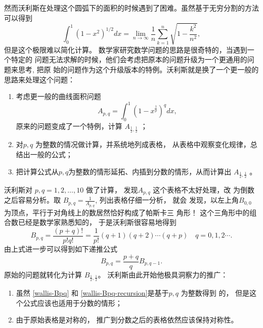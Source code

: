 {然而沃利斯在处理这个圆弧下的面积的时候遇到了困难。虽然基于无穷分割的方法可以得到 
$$ \int_0^1 (1-x^2)^{1/2} dx = \lim_{n\rightarrow \infty} \frac{1}{n} \sum^n_{k=1} \sqrt{1-\frac{k^2}{n^2}} ,$$ 
但是这个极限难以简化计算。 数学家研究数学问题的思路是很奇特的，当遇到一个特定的
问题无法求解的时候，他们会考虑把原本的问题升级为一个更通用的问题来思考, 把原
始的问题作为这个升级版本的特例。沃利斯就是换了一个更一般的思路来处理这个问题：

\begin{enumerate}
\item 考虑更一般的曲线面积问题
$$ A_{p,q} = \int_0^1 (1-x^\frac{1}{p})^q dx ,$$ 
原来的问题变成了一个特例，计算 $A_{\frac{1}{2},\frac{1}{2}}$ ；

\item 对$p,q$ 为整数的情况做计算，并系统地列成表格， 从表格中观察变化规律，总结出一般的公式；
\item 把计算公式从$p,q$为整数的情形延拓、内插到分数的情形，从而计算出
$A_{\frac{1}{2},\frac{1}{2}}$ 。
\end{enumerate}

沃利斯对 $p,q = 1,2,\ldots,10$ 做了计算， 发现$A_{p,q}$ 这个表格不太好处理，改
为倒数之后容易分析。取 $B_{p,q} = \frac{1}{A_{p,q}}$, 列出表格仔细一分析， 就会
发现，以左上角$B_{0,0}$ 为顶点，平行于对角线上的数居然恰好构成了帕斯卡三
角形！ 这个三角形中的组合数已经是数学家熟悉知的， 于是沃利斯很容易地得到
\begin{equation}
\label{wallis-Bpq}
B_{p,q} = \frac{(p+q)!} {p! q!} = \frac{1}{p!} (q+1) (q+2) \cdots (q+p) \quad q=0,1,2 \cdots .
\end{equation}
由上式进一步可以得到如下递推公式
\begin{equation}
\label{wallis-Bpq-recursion}
B_{p,q} = \frac{p+q}{q} B_{p,q-1} .
\end{equation}
原始的问题就转化为计算 $B_{\frac{1}{2},\frac{1}{2}}$。 沃利斯由此开始他极具洞察力的推广：
\begin{enumerate}
\item 虽然 \eqref{wallis-Bpq} 和 \eqref{wallis-Bpq-recursion}是基于$p,q$ 为整数得到
的， 但是这个公式应该也适用于分数的情形；
\item 由于原始表格是对称的， 推广到分数之后的表格依然应该保持对称性。
\end{enumerate}

}
